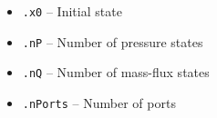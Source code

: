 \documentclass[%
aspectratio=43 %
,table %
]{beamer}
\begin{document}
\begin{frame}
\begin{columns}
\begin{column}[t]{.55\textwidth}
\begin{itemize}
 \item \texttt{.x0} -- Initial state

 \item \texttt{.nP} -- Number of pressure states

 \item \texttt{.nQ} -- Number of mass-flux states

 \item \texttt{.nPorts} -- Number of ports

\end{itemize}

\end{column}

\end{columns}

\end{frame}

\end{document}
